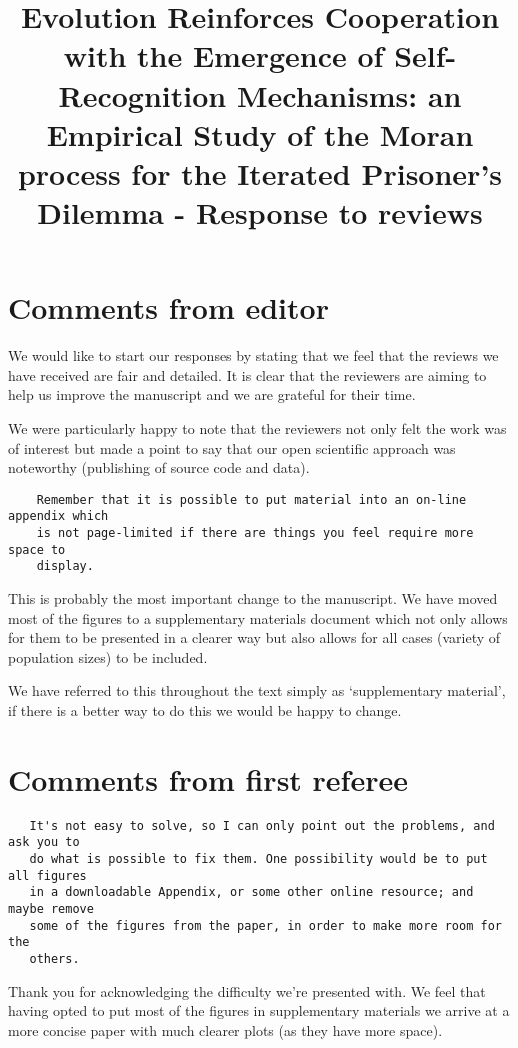 \documentclass[a4]{article}
\title{Evolution Reinforces Cooperation with the Emergence of Self-Recognition
       Mechanisms: an Empirical Study of the Moran process for the Iterated
       Prisoner's Dilemma - Response to reviews}
\begin{document}
\maketitle

\section{Comments from editor}

We would like to start our responses by stating that we feel that the reviews we
have received are fair and detailed. It is clear that the reviewers are aiming
to help us improve the manuscript and we are grateful for their time.

We were particularly happy to note that the reviewers not only felt the work was
of interest but made a point to say that our open scientific approach was
noteworthy (publishing of source code and data).


\begin{verbatim}
    Remember that it is possible to put material into an on-line appendix which
    is not page-limited if there are things you feel require more space to
    display.
\end{verbatim}

This is probably the most important change to the manuscript. We have moved most
of the figures to a supplementary materials document which not only allows for
them to be presented in a clearer way but also allows for all cases (variety of
population sizes) to be included.

We have referred to this throughout the text simply as `supplementary material',
if there is a better way to do this we would be happy to change.

\section{Comments from first referee}

\begin{verbatim}
   It's not easy to solve, so I can only point out the problems, and ask you to
   do what is possible to fix them. One possibility would be to put all figures
   in a downloadable Appendix, or some other online resource; and maybe remove
   some of the figures from the paper, in order to make more room for the
   others.
\end{verbatim}

Thank you for acknowledging the difficulty we're presented with. We feel that
having opted to put most of the figures in supplementary materials we arrive at
a more concise paper with much clearer plots (as they have more space).
\end{document}

